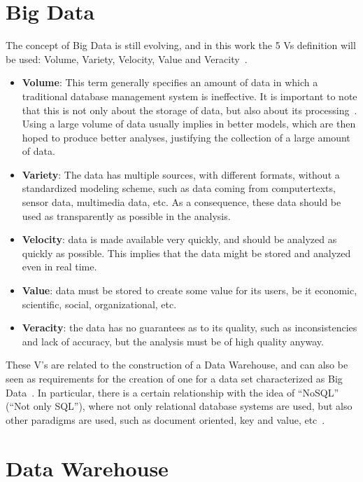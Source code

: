 \section{Big Data}\label{ch:fun:bigdata}

The concept of Big Data is still evolving, and in this work the 5 Vs definition will be used: Volume, Variety, Velocity, Value and Veracity~\cite{kacfahemaniUnderstandableBigData2015}.

\begin{itemize}[noitemsep]
  \item \textbf{Volume}: This term generally specifies an amount of data in which a traditional database management system is ineffective.
  It is important to note that this is not only about the storage of data, but also about its processing~\cite{boussoufBigDataBased2018}.
  Using a large volume of data usually implies in better models, which are then hoped to produce better analyses, justifying the collection of a large amount of data.
  \item \textbf{Variety}: The data has multiple sources, with different formats, without a standardized modeling scheme, such as data coming from computertexts, sensor data, multimedia data, etc.
  As a consequence, these data should be used as transparently as possible in the analysis.
  \item \textbf{Velocity}: data is made available very quickly, and should be analyzed as quickly as possible.
  This implies that the data might be stored and analyzed even in real time.
  \item \textbf{Value}: data must be stored to create some value for its users, be it economic, scientific, social, organizational, etc.
  \item \textbf{Veracity}: the data has no guarantees as to its quality, such as inconsistencies and lack of accuracy, but the analysis must be of high quality anyway.
\end{itemize}

These V's are related to the construction of a Data Warehouse, and can also be seen as requirements for the creation of one for a data set characterized as Big Data~\cite{zhangBigDataFramework2017}.
In particular, there is a certain relationship with the idea of ``NoSQL'' (``Not only SQL''), where not only relational database systems are used, but also other paradigms are used, such as document oriented, key and value, etc~\cite{bimonteOpenIssuesBig2016}.

\section{Data Warehouse}\label{ch:fun:dw}

